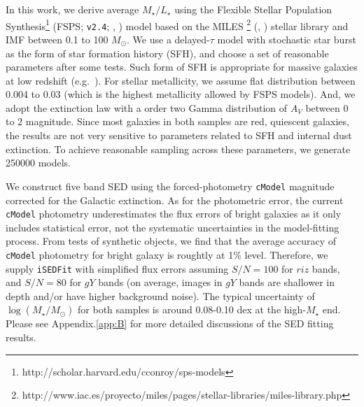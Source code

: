 \documentclass{emulateapj}
\def\msun{$M_\odot$}
\def\cmodel{\texttt{cModel}}
\def\mstar{{$M_{\star}$}}
\def\logms{{$\log (M_{\star}/M_{\odot})$}}
\def\m2l{{$M_{\star}/L_{\star}$}}
\newcommand{\song}[1]{\textcolor{magenta}{\textbf{[Song: #1]}}}
\begin{document}
\begin{CJK*}{UTF8}{gbsn}
    In this work, we derive average \m2l{} using the Flexible Stellar Population 
    Synthesis\footnote{http://scholar.harvard.edu/cconroy/sps-models}
    (FSPS; \texttt{v2.4}; \citealt{FSPS}, \citealt{Conroy2010}) model based on the MILES
    \footnote{http://www.iac.es/proyecto/miles/pages/stellar-libraries/miles-library.php}
    (\citealt{MILES1}, \citealt{MILES2}) stellar library and \citet{Chabrier2003} 
    IMF between 0.1 to 100 \msun. 
    We use a delayed-$\tau$ model with stochastic star burst as the form of star 
    formation history (SFH), and choose a set of reasonable parameters after some tests.  
    Such form of SFH is appropriate for massive galaxies at low redshift 
    (e.g.\ \citealt{Kauffmann2003}). 
    For stellar metallicity, we assume flat distribution between 0.004 to 0.03 (which is 
    the highest metallicity allowed by FSPS models).  
    And, we adopt the \citet{Calzetti2000} extinction law with a order two Gamma 
    distribution of $A_{V}$ between 0 to 2 magnitude.
    Since most galaxies in both samples are red, quiescent galaxies, the results are 
    not very sensitive to parameters related to SFH and internal dust extinction. 
    To achieve reasonable sampling across these parameters, we generate 250000 models. 
    
    We construct five band SED using the forced-photometry \cmodel{} magnitude corrected 
    for the Galactic extinction. 
    As for the photometric error, the current \cmodel{} photometry underestimates 
    the flux errors of bright galaxies as it only includes statistical error, not the 
    systematic uncertainties in the model-fitting process.  
    From tests of synthetic objects, we find that the average accuracy of \cmodel{} 
    photometry for bright galaxy is roughtly at 1\% level. 
    Therefore, we supply \texttt{iSEDFit} with simplified flux errors assuming $S/N = 100$ 
    for $riz$ bands, and $S/N = 80$ for $gY$ bands (on average, images in $gY$ bands are 
    shallower in depth and/or have higher background noise).  
    The typical uncertainty of \logms{} for both samples is around 0.08-0.10 dex at the 
    high-\mstar{} end. 
    Please see Appendix.\ref{app:B} for more detailed discussions of the SED fitting
    results.  
    
    

\end{CJK*}
\end{document}

